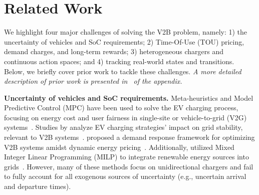 \section{Related Work}
\label{sec:related_work}
% 

We highlight four major challenges of solving the V2B problem, namely: 1) the uncertainty of vehicles and SoC requirements; 2) Time-Of-Use (TOU) pricing, demand charges, and long-term rewards; 3) heterogeneous chargers and continuous action spaces; and 4) tracking real-world states and transitions. Below, we briefly cover prior work to tackle these challenges. \textit{A more detailed description of prior work is presented in~ of the appendix.}  

\noindent\textbf{Uncertainty of vehicles and SoC requirements.} 
Meta-heuristics and Model Predictive Control (MPC) have been used to solve the EV charging process, focusing on energy cost and user fairness in single-site or vehicle-to-grid (V2G) systems~\cite{AORC2013, 5986769, 9409126, MJG2015}. 
Studies by \citeauthor{richardson2011electric} analyze EV charging strategies' impact on grid stability, relevant to V2B systems~\cite{richardson2011electric}. \citeauthor{8274175} proposed a demand response framework for optimizing V2B systems amidst dynamic energy pricing~\cite{8274175}. Additionally, \citeauthor{oconnell2010integration} utilized Mixed Integer Linear Programming (MILP) to integrate renewable energy sources into grids~\cite{oconnell2010integration}.
However, many of these methods focus on unidirectional chargers and fail to fully account for all exogenous sources of uncertainty (e.g., uncertain arrival and departure times).



